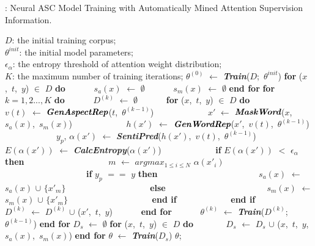 \documentclass[11pt,a4paper]{article}
\begin{document}
{
\renewcommand\baselinestretch{1.15}
\begin{algorithm}[t]
\renewcommand{\algorithmicrequire}{\textbf{Input:}}\footnotesize
\renewcommand\algorithmicensure {\textbf{Return:} }\footnotesize
\caption{: Neural ASC Model Training with Automatically Mined Attention Supervision Information.}
\label{Alg_OurApproach}
\begin{algorithmic}[1]
\REQUIRE
$\textit{D}$: the initial training corpus;\\
$\theta^{init}$: the initial model parameters;\\
$\epsilon_{\alpha}$: the entropy threshold of attention weight distribution;\\
$\textit{K}$: the maximum number of training iterations;
\STATE $\theta^{(0)}$ $\leftarrow$ \textit{\textbf{Train}}($\textit{D}$;\ $\theta^{init}$)
\STATE \textbf{for} ($x$,\ $t$,\ $y$) $\in$ $\textit{D}$ \textbf{do}
\STATE \ \ \ \ \ \ $s_a(x)$ $\leftarrow$ $\emptyset$
\STATE \ \ \ \ \ \ $s_m(x)$ $\leftarrow$ $\emptyset$
\STATE \textbf{end for}
\STATE \textbf{for} $k=1,2...,\textit{K}$ \textbf{do}
\STATE \ \ \ \ \ \ $\textit{D}^{(k)}$ $\leftarrow$ $\emptyset$
\STATE \ \ \ \ \ \ \textbf{for} ($x$,\ $t$,\ $y$) $\in$ $\textit{D}$ \textbf{do}
\STATE \ \ \ \ \ \ \ \ \ \ \ \ $v(t)$ $\leftarrow$ $\textit{\textbf{GenAspectRep}}$($t$,\ $\theta^{(k-1)}$)
\STATE \ \ \ \ \ \ \ \ \ \ \ \ $x'$ $\leftarrow$ $\textit{\textbf{MaskWord}}$($x$,\ $s_a(x)$,\ $s_m(x)$)
\STATE \ \ \ \ \ \ \ \ \ \ \ \ $h(x')$  $\leftarrow$ $\textit{\textbf{GenWordRep}}$($x'$,\ $v(t)$,\ $\theta^{(k-1)}$)
\STATE \ \ \ \ \ \ \ \ \ \ \ \ $y_p$, $\alpha(x')$ $\leftarrow$ \textit{\textbf{SentiPred}}($h(x')$,\ $v(t)$,\ $\theta^{(k-1)}$)
\STATE \ \ \ \ \ \ \ \ \ \ \ \ $E(\alpha(x'))$ $\leftarrow$ \textit{\textbf{CalcEntropy}}($\alpha(x')$)
\STATE \ \ \ \ \ \ \ \ \ \ \ \ \textbf{if} $E(\alpha(x'))$ $<$ $\epsilon_{\alpha}$ \textbf{then}
\STATE \ \ \ \ \ \ \ \ \ \ \ \ \ \ \ \ \ \ \ $m$ $\leftarrow$ $argmax_{1\leq i \leq N}$ $\alpha(x'_i)$
\STATE \ \ \ \ \ \ \ \ \ \ \ \ \ \ \ \ \ \ \ \textbf{if} $y_p$ $==$ $y$ \textbf{then}
\STATE \ \ \ \ \ \ \ \ \ \ \ \ \ \ \ \ \ \ \ \ \ \ \ $s_a(x)$ $\leftarrow$ $s_a(x)$ $\cup$ $\{x'_m\}$
\STATE \ \ \ \ \ \ \ \ \ \ \ \ \ \ \ \ \ \ \ \textbf{else}
\STATE \ \ \ \ \ \ \ \ \ \ \ \ \ \ \ \ \ \ \ \ \ \ \ $s_m(x)$ $\leftarrow$ $s_m(x)$ $\cup$ $\{x'_m\}$
\STATE \ \ \ \ \ \ \ \ \ \ \ \ \ \ \ \ \ \ \ \textbf{end if}
\STATE \ \ \ \ \ \ \ \ \ \ \ \ \textbf{end if}
\STATE \ \ \ \ \ \ \ \ \ \ \ \ $\textit{D}^{(k)}$ $\leftarrow$ $\textit{D}^{(k)}$ $\cup$ ($x'$,\ $t$,\ $y$)
\STATE \ \ \ \ \ \ \textbf{end for}
\STATE \ \ \ \ \ \ $\theta^{(k)}$ $\leftarrow$ \textit{\textbf{Train}}($\textit{D}^{(k)}$;\ $\theta^{(k-1)}$)
\STATE \textbf{end for}
\STATE $\textit{D}_s$ $\leftarrow$ $\emptyset$
\STATE \textbf{for} ($x$,\ $t$,\ $y$) $\in$ $\textit{D}$ \textbf{do}
\STATE \ \ \ \ \ \ \ $\textit{D}_s$ $\leftarrow$ $\textit{D}_s$ $\cup$ ($x$,\ $t$,\ $y$,\ $s_a(x)$,\ $s_m(x)$)
\STATE \textbf{end for}
\STATE $\theta$ $\leftarrow$ \textit{\textbf{Train}}($\textit{D}_s$)
\ENSURE $\theta$;
\end{algorithmic}
\end{algorithm}
\par}
\end{document}
